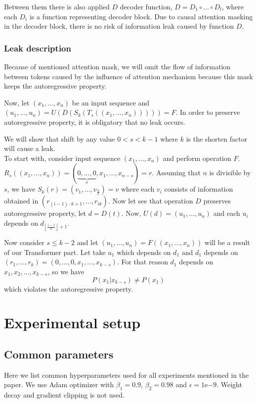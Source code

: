 \documentclass[11pt]{article}
\newcommand{\expnumber}[2]{{#1}\mathrm{e}{#2}}
\newcommand{\floor}[1]{\left\lfloor #1 \right\rfloor}
\begin{document}
Between them there is also applied $D$ decoder function, $D = D_1 \circ \dots \circ D_l$, where each $D_i$ is a function representing decoder block. Due to causal attention masking in the decoder block, there is no risk of information leak caused by function $D$. 

\subsubsection{Leak description}
Because of mentioned attention mask, we will omit the flow of information between tokens caused by the influence of attention mechanism because this mask keeps the autoregressive property.

Now, let $(x_1, ..., x_n)$ be an input sequence and $(u_1, ..., u_n) = U(D(S_k(T_s((x_1, ..., x_n))))) = F$. In order to preserve autoregressive property, it is obligatory that no leak occurs.

We will show that shift by any value $0<s<k-1$ where $k$ is the shorten factor will cause a leak.\\
To start with, consider input sequence $(x_1, ..., x_n)$ and perform operation $F$. $R_s((x_1, ..., x_n)) = (\underbrace{0,...,0}_{s},x_1,...,x_{n-s}) = r$. Assuming that $n$ is divisible by $s$, we have $S_k(r) = (v_1, ..., v_{\frac{n}{k}}) = v$ where each $v_i$ consists of information obtained in $(r_{(i-1)\cdot k + 1},..., r_{ik})$. Now let see that operation $D$ preserves autoregressive property, let $d = D(t)$. Now, $U(d) = (u_1, ..., u_n)$ and each $u_i$ depends on $d_{\floor{\frac{i-1}{k}}+1}$. 

Now consider $s \le k-2$ and let $(u_1, ..., u_n) = F((x_1,...,x_n))$ will be a result of our Transformer part. Let take $u_1$ which depends on $d_1$ and $d_1$ depends on $ (r_1, ..., r_k) = (0,...,0,x_1,...,x_{k-s}) $. For that reason $d_1$ depends on $x_{1}, x_{2}, ..., x_{k-s}$,
so we have
 $$ P(x_1 | x_{k-s}) \neq P(x_1)$$
which violates the autoregressive property.

\section{Experimental setup}
\subsection{Common parameters}
Here we list common hyperparameters used for all experiments mentioned in the paper. We use Adam optimizer with $\beta_1 = 0.9$, $\beta_2 = 0.98$ and $\epsilon = \expnumber{1}{-9}$. Weight decay and gradient clipping is not used.
\end{document}
